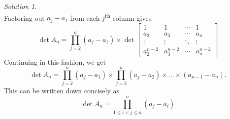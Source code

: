 \documentclass[11pt]{report}
\theoremstyle{remark}
\newtheorem*{solution}{Solution}
\begin{document}
\begin{solution}
\[        \] Factoring out $a_j - a_1$ from each $j$\textsuperscript{th} column gives
        \[
            \det{A_n} = \prod_{j = 2}^{n} (a_j - a_1) \times \det \begin{bmatrix}
                 1 & 1 & \cdots & 1 \\
                 a_2 & a_3 & \cdots & a_n \\
                \vdots & \vdots & \ddots & \vdots \\
                a_2^{n - 2} & a_3^{n - 2} & \cdots &
                a_n^{n - 2}
            \end{bmatrix}
        \] Continuing in this fashion, we get \[
            \det{A_n} = \prod_{j = 2}^{n} (a_j - a_1) \times \prod_{j = 3}^{n} (a_j
            - a_2) \times \dots \times (a_{n - 1} - a_n).
        \] This can be written down concisely as \[
            \det{A_n} = \prod_{1 \leq i < j \leq n}^{n} (a_j - a_i)
        \] 
    \end{solution}
    
\end{document}

